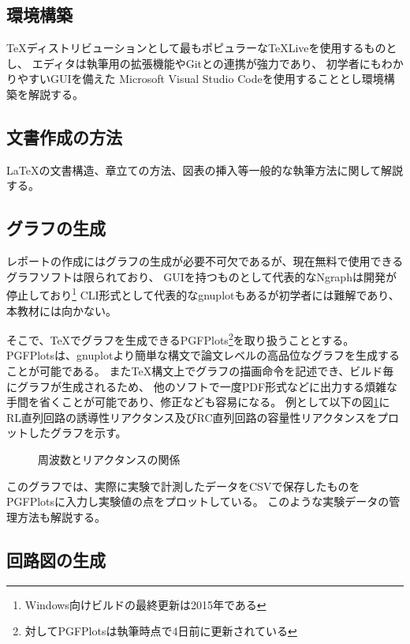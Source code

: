 \documentclass[uplatex]{jsarticle}
\begin{document}
    \subsection{環境構築}
        \TeX ディストリビューションとして最もポピュラーな\TeX Liveを使用するものとし、
        エディタは執筆用の拡張機能やGitとの連携が強力であり、
        初学者にもわかりやすいGUIを備えた
        Microsoft Visual Studio Codeを使用することとし環境構築を解説する。

    \subsection{文書作成の方法}
        \LaTeX の文書構造、章立ての方法、図表の挿入等一般的な執筆方法に関して解説する。

    \subsection{グラフの生成}
        レポートの作成にはグラフの生成が必要不可欠であるが、現在無料で使用できるグラフソフトは限られており、
        GUIを持つものとして代表的なNgraphは開発が停止しており\footnote{Windows向けビルドの最終更新は2015年である}
        CLI形式として代表的なgnuplotもあるが初学者には難解であり、本教材には向かない。
        
        そこで、\TeX でグラフを生成できるPGFPlots\footnote{対してPGFPlotsは執筆時点で4日前に更新されている}を取り扱うこととする。
        PGFPlotsは、gnuplotより簡単な構文で論文レベルの高品位なグラフを生成することが可能である。
        また\TeX 構文上でグラフの描画命令を記述でき、ビルド毎にグラフが生成されるため、
        他のソフトで一度PDF形式などに出力する煩雑な手間を省くことが可能であり、修正なども容易になる。
        例として以下の図\ref{fig:XLXC}に
        RL直列回路の誘導性リアクタンス及びRC直列回路の容量性リアクタンスをプロットしたグラフを示す。
        
        \begin{figure}[H]
            \centering
            \caption{周波数とリアクタンスの関係}
            \label{fig:XLXC}
        \end{figure}

        このグラフでは、実際に実験で計測したデータをCSVで保存したものをPGFPlotsに入力し実験値の点をプロットしている。
        このような実験データの管理方法も解説する。

    \subsection{回路図の生成}
        
\end{document}

